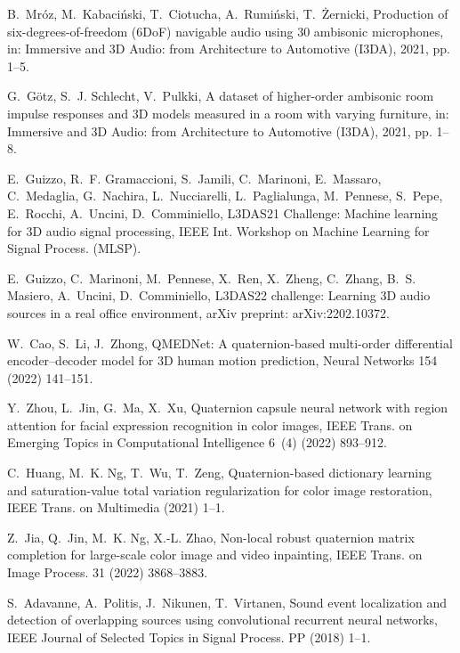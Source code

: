 \documentclass[3p, preprint, twocolumn]{elsarticle}
\begin{document}
\begin{thebibliography}{10}
B.~Mróz, M.~Kabaciński, T.~Ciotucha, A.~Rumiński, T.~Żernicki, Production
  of six-degrees-of-freedom (6{DoF}) navigable audio using 30 ambisonic
  microphones, in: Immersive and 3D Audio: from Architecture to Automotive
  (I3DA), 2021, pp. 1--5.

G.~Götz, S.~J. Schlecht, V.~Pulkki, A dataset of higher-order ambisonic room
  impulse responses and 3{D} models measured in a room with varying furniture,
  in: Immersive and 3D Audio: from Architecture to Automotive (I3DA), 2021, pp.
  1--8.

E.~Guizzo, R.~F. Gramaccioni, S.~Jamili, C.~Marinoni, E.~Massaro, C.~Medaglia,
  G.~Nachira, L.~Nucciarelli, L.~Paglialunga, M.~Pennese, S.~Pepe, E.~Rocchi,
  A.~Uncini, D.~Comminiello, {L3DAS}21 {C}hallenge: Machine learning for 3{D}
  audio signal processing, IEEE Int. Workshop on Machine Learning for Signal
  Process. (MLSP).

E.~Guizzo, C.~Marinoni, M.~Pennese, X.~Ren, X.~Zheng, C.~Zhang, B.~S. Masiero,
  A.~Uncini, D.~Comminiello, {L3DAS22} challenge: Learning 3{D} audio sources
  in a real office environment, arXiv preprint: arXiv:2202.10372.

W.~Cao, S.~Li, J.~Zhong, {QMEDN}et: A quaternion-based multi-order differential
  encoder–decoder model for 3{D} human motion prediction, Neural Networks 154
  (2022) 141--151.

Y.~Zhou, L.~Jin, G.~Ma, X.~Xu, Quaternion capsule neural network with region
  attention for facial expression recognition in color images, IEEE Trans. on
  Emerging Topics in Computational Intelligence 6~(4) (2022) 893--912.

C.~Huang, M.~K. Ng, T.~Wu, T.~Zeng, Quaternion-based dictionary learning and
  saturation-value total variation regularization for color image restoration,
  IEEE Trans. on Multimedia (2021) 1--1.

Z.~Jia, Q.~Jin, M.~K. Ng, X.-L. Zhao, Non-local robust quaternion matrix
  completion for large-scale color image and video inpainting, IEEE Trans. on
  Image Process. 31 (2022) 3868--3883.

S.~Adavanne, A.~Politis, J.~Nikunen, T.~Virtanen, Sound event localization and
  detection of overlapping sources using convolutional recurrent neural
  networks, IEEE Journal of Selected Topics in Signal Process. PP (2018) 1--1.


\end{thebibliography}
\end{document}

